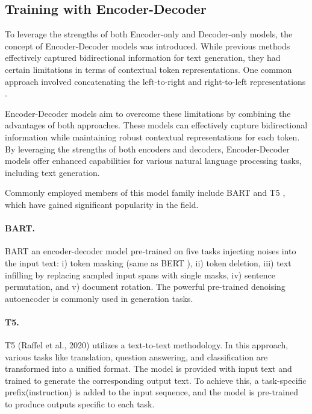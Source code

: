 \subsection{Training with Encoder-Decoder}
To leverage the strengths of both Encoder-only and Decoder-only models, the concept of Encoder-Decoder models was introduced. While previous methods effectively captured bidirectional information for text generation, they had certain limitations in terms of contextual token representations. One common approach involved concatenating the left-to-right and right-to-left representations \cite{peters2018deep}.

Encoder-Decoder models aim to overcome these limitations by combining the advantages of both approaches. These models can effectively capture bidirectional information while maintaining robust contextual representations for each token. By leveraging the strengths of both encoders and decoders, Encoder-Decoder models offer enhanced capabilities for various natural language processing tasks, including text generation.

Commonly employed members of this model family include BART \cite{lewis-etal-2020-bart} and T5 \cite{raffel2020exploring}, which have gained significant popularity in the field.

\paragraph{BART.} BART \cite{lewis-etal-2020-bart} an encoder-decoder model pre-trained on five tasks injecting noises into the input text: i) token masking (same as BERT \cite{devlin2018bert}), ii) token deletion, iii) text infilling by replacing sampled input spans with single masks, iv) sentence permutation, and v) document rotation. The powerful pre-trained denoising autoencoder is commonly used in generation tasks.

\paragraph{T5.} T5 (Raffel et al., 2020) utilizes a text-to-text methodology. In this approach, various tasks like translation, question answering, and classification are transformed into a unified format. The model is provided with input text and trained to generate the corresponding output text. To achieve this, a task-specific prefix(instruction) is added to the input sequence, and the model is pre-trained to produce outputs specific to each task.\\



